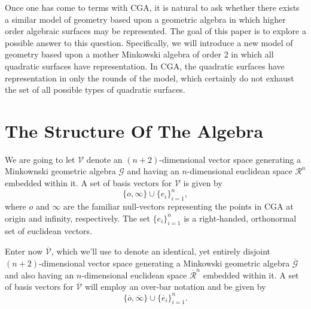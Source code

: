 \documentclass{birkjour}
\theoremstyle{definition}
\theoremstyle{remark}
\numberwithin{equation}{section}
\newcommand{\V}{\mathcal{V}}
\newcommand{\G}{\mathcal{G}}
\newcommand{\R}{\mathcal{R}}
\newcommand{\Vb}{\overline{\mathcal{V}}}
\newcommand{\Gb}{\overline{\mathcal{G}}}
\newcommand{\Rb}{\overline{\mathcal{R}}}
\newcommand{\nvao}{o}
\newcommand{\nvai}{\infty}
\newcommand{\nvaob}{\overline{o}}
\newcommand{\nvaib}{\overline{\infty}}
\newcommand{\eb}{\overline{e}}
\begin{document}
Once one has come to terms with CGA, it is natural to ask whether there exists a similar model of
geometry based upon a geometric algebra in which higher order algebraic surfaces may be
represented.  The goal of this paper is to explore a possible answer to this question.  Specifically,
we will introduce a new model of geometry based upon a mother Minkowski algebra of order 2
in which all quadratic surfaces have representation.  In CGA, the quadratic surfaces have 
representation in only the rounds of the model, which certainly do not exhaust the set of
all possible types of quadratic surfaces.

\section{The Structure Of The Algebra}

We are going to let $\V$ denote an $(n+2)$-dimensional vector space generating
a Minkownski geometric algebra $\G$ and having an $n$-dimensional euclidean space
$\R^n$ embedded within it.  A set of basis vectors for $\V$ is given by
\begin{equation*}
\{\nvao,\nvai\}\cup\{e_i\}_{i=1}^n,
\end{equation*}
where $\nvao$ and $\nvai$ are the familiar null-vectors representing the points in CGA
at origin and infinity, respectively.  The set $\{e_i\}_{i=1}^n$ is a right-handed, orthonormal set of
euclidean vectors.

Enter now $\Vb$, which we'll use to denote an identical, yet entirely disjoint $(n+2)$-dimensional
vector space generating a Minkowski geometric algebra $\Gb$ and also having an $n$-dimensional
euclidean space $\Rb^n$ embedded within it.  A set of basis vectors for $\Vb$ will employ
an over-bar notation and be given by
\begin{equation*}
\{\nvaob,\nvaib\}\cup\{\eb_i\}_{i=1}^n.
\end{equation*}
\end{document}

